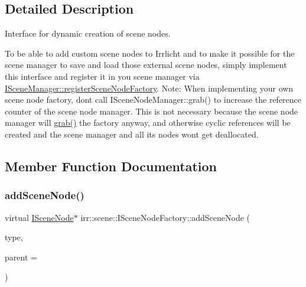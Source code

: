 \subsection{Detailed Description}
Interface for dynamic creation of scene nodes. 

To be able to add custom scene nodes to Irrlicht and to make it possible for the scene manager to save and load those external scene nodes, simply implement this interface and register it in you scene manager via \hyperlink{classirr_1_1scene_1_1ISceneManager_a75ac9315def74ae5e26a2d6a2f5a38e9}{I\+Scene\+Manager\+::register\+Scene\+Node\+Factory}. Note\+: When implementing your own scene node factory, don\textquotesingle{}t call I\+Scene\+Node\+Manager\+::grab() to increase the reference counter of the scene node manager. This is not necessary because the scene node manager will \hyperlink{classirr_1_1IReferenceCounted_a396f9cdbe311ada278626477b3c6f0f5}{grab()} the factory anyway, and otherwise cyclic references will be created and the scene manager and all its nodes won\textquotesingle{}t get deallocated. 

\subsection{Member Function Documentation}
\mbox{\label{classirr_1_1scene_1_1ISceneNodeFactory_a540de57f9f72a70ee622c536859f5997}} 
\subsubsection{\texorpdfstring{add\+Scene\+Node()}{addSceneNode()}\hspace{0.1cm}{\footnotesize\ttfamily [1/4]}}
{\footnotesize\ttfamily virtual \hyperlink{classirr_1_1scene_1_1ISceneNode}{I\+Scene\+Node}$\ast$ irr\+::scene\+::\+I\+Scene\+Node\+Factory\+::add\+Scene\+Node (\begin{DoxyParamCaption}\item[{\hyperlink{namespaceirr_1_1scene_acad3d7ef92a9807d391ba29120f3b7bd}{E\+S\+C\+E\+N\+E\+\_\+\+N\+O\+D\+E\+\_\+\+T\+Y\+PE}}]{type,  }\item[{\hyperlink{classirr_1_1scene_1_1ISceneNode}{I\+Scene\+Node} $\ast$}]{parent = {} }\end{DoxyParamCaption})\hspace{0.3cm}{\ttfamily [pure virtual]}}



